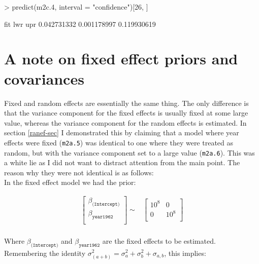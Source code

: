 \documentclass{article}
\begin{document}
\begin{Schunk}
\begin{Sinput}
> predict(m2c.4, interval = "confidence")[26, ]
\end{Sinput}
\begin{Soutput}
        fit         lwr         upr 
0.042731332 0.001178997 0.119930619 
\end{Soutput}
\end{Schunk}


\section{A note on fixed effect priors and covariances}
\label{PriorContr-sec}

Fixed and random effects are essentially the same thing. The only difference is that the variance component for the fixed effects is usually fixed at some large value, whereas the variance component for the random effects is estimated.  In section \ref{ranef-sec} I demonstrated this by claiming that a model where year effects were fixed (\texttt{m2a.5}) was identical to one where they were treated as random, but with the variance component set to a large value (\texttt{m2a.6}). This was a white lie as I did not want to distract attention from the main point. The reason why they were not identical is as follows:\\

In the fixed effect model we had the prior:  

\begin{equation}
\begin{array}{rcl}
\left[
\begin{array}{c}
 \beta_{\texttt{(Intercept)}}\\
 \beta_{\texttt{year1962}}\\
\end{array}
\right]
\sim
&
\left[
\begin{array}{cc}
10^8&0\\
0&10^8\\
\end{array}
\right]\\
\end{array}
\end{equation}

Where $\beta_{\texttt{(Intercept)}}$ and $\beta_{\texttt{year1962}}$ are the fixed effects to be estimated.\\

Remembering the identity  $\sigma^{2}_{(a+b)} = \sigma^{2}_{a}+ \sigma^{2}_{b}+\sigma_{a,b}$, this implies:
\end{document}
